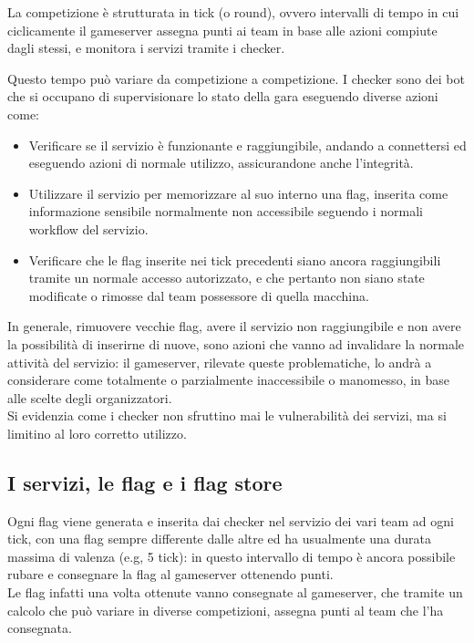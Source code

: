 La competizione è strutturata in tick (o round), ovvero intervalli di tempo in cui ciclicamente il gameserver assegna punti ai team in base alle azioni compiute dagli stessi, e monitora i servizi tramite i checker.

Questo tempo può variare da competizione a competizione. I checker sono dei bot che si occupano di supervisionare lo stato della gara eseguendo diverse azioni come:
\begin{itemize}
    \setlength{\itemsep}{2pt}
    \setlength{\parskip}{2pt}
    \item Verificare se il servizio è funzionante e raggiungibile, andando a connettersi ed eseguendo azioni
    di normale utilizzo, assicurandone anche l'integrità.
    \item Utilizzare il servizio per memorizzare al suo interno una flag, inserita come informazione sensibile normalmente non accessibile seguendo i normali workflow del servizio.
    \item Verificare che le flag inserite nei tick precedenti siano ancora raggiungibili tramite un normale accesso autorizzato, e che
    pertanto non siano state modificate o rimosse dal team possessore di quella macchina.
\end{itemize}

In generale, rimuovere vecchie flag, avere il servizio non raggiungibile e non avere la possibilità di inserirne di nuove, sono azioni che vanno ad invalidare la normale attività del servizio: il gameserver, rilevate queste problematiche, lo andrà a considerare come totalmente o parzialmente inaccessibile o manomesso, in base alle scelte degli organizzatori.\\
Si evidenzia come i checker non sfruttino mai le vulnerabilità dei servizi, ma si limitino al loro corretto utilizzo.

\subsection{I servizi, le flag e i flag store}

Ogni flag viene generata e inserita dai checker nel servizio dei vari team ad ogni tick, con una flag sempre differente dalle altre ed ha usualmente una durata massima di valenza (e.g, 5 tick): in questo intervallo di tempo è ancora possibile rubare e consegnare la flag al gameserver ottenendo punti.\\
Le flag infatti una volta ottenute vanno consegnate al gameserver, che tramite un calcolo che può variare in diverse competizioni, assegna punti al team che l'ha consegnata.\\

